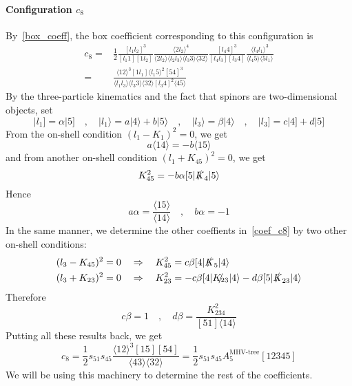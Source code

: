 \paragraph{Configuration $c_{8}$}
By~\cref{box_coeff}, the box coefficient corresponding to this configuration is
\begin{equation}
\begin{split}
c_8 = & \frac{1}{2}
\frac{[l_1 l_2]^3}{[l_1 1][1l_2]}
\frac{\langle 2 l_2 \rangle^4}{\langle 2l_2 \rangle\langle l_2 l_3\rangle\langle l_3 3 \rangle\langle 32 \rangle}
\frac{[l_4 4 ]^3}{[l_4 l_3][l_3 4]}
\frac{\langle l_4 l_1 \rangle^3}{\langle l_4 5 \rangle\langle 5 l_1\rangle}
\\
= &
\frac{\langle 12 \rangle^3[1l_1 ]\langle l_1 5\rangle^2 [54]^3}{\langle l_1 l_3\rangle\langle l_3 3 \rangle\langle 32 \rangle [l_3 4 ]^2\langle 45\rangle}
\end{split}
\end{equation}
By the three-particle kinematics and the fact that spinors are two-dimensional objects, set
\begin{equation}\label{coef_c8}
|l_1] = \alpha |5]
\quad,\quad
|l_1\rangle = a|4\rangle + b|5\rangle
\quad,\quad
|l_3\rangle = \beta |4\rangle
\quad,\quad
|l_3] = c|4] + d|5]
\end{equation}
From the on-shell condition $(l_1 - K_1)^2 = 0$, we get
\begin{equation}
a\langle 14\rangle = -b\langle 15 \rangle
\end{equation}
and from another on-shell condition $(l_1 + K_{45})^2 = 0$, we get
\begin{equation}
K_{45}^2 = -b\alpha [5|\slashed{K}_4|5\rangle 
\end{equation}
Hence
\begin{equation}
a\alpha = \frac{\langle 15\rangle}{\langle 14\rangle}\quad,\quad
b\alpha = -1
\end{equation}
In the same manner, we determine the other coeffients in~\cref{coef_c8} by two other on-shell conditions:
\begin{equation}
\begin{split}
& (l_3 - K_{45})^2 = 0 \quad\Rightarrow\quad
K_{45}^2 = c\beta [4|\slashed{K}_5|4\rangle
\\
& (l_3 + K_{23})^2 = 0 \quad\Rightarrow\quad
K_{23}^2 = -c\beta [4|\slashed{K_{23}}|4\rangle - d\beta [5|\slashed{K}_{23}|4\rangle
\end{split}
\end{equation}
Therefore
\begin{equation}
c\beta = 1 \quad,\quad 
d\beta = \frac{K_{234}^2}{[51]\langle 14 \rangle}
\end{equation}
Putting all these results back, we get
\begin{equation}
c_8 = \frac{1}{2} s_{51}s_{45} \frac{\langle 12 \rangle^3 [15] [54]}{\langle 43 \rangle\langle 32 \rangle}=\frac{1}{2} s_{51}s_{45} A_5^{\textrm{MHV-tree}}[12345]
\end{equation}
We will be using this machinery to determine the rest of the coefficients.
%
